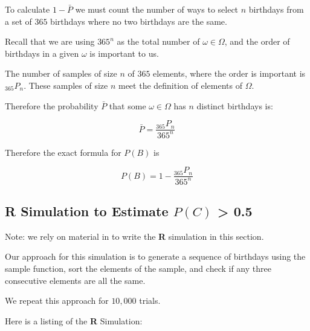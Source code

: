 \documentclass[a4paper,11pt]{article}
\begin{document}
To calculate $1-\bar{P}$ we must count the number of ways to select $n$
birthdays from a set of $365$ birthdays where no two birthdays are the
same.

Recall that we are using $365^{n}$ as the total number of
$\omega \in \Omega$, and the order of birthdays in a given $\omega${}
is important to us.

The number of samples of size $n$ of $365$ elements, where the order
is important is ${}_{365}P_{n}$. These samples of size $n$ meet the
definition of elements of $\Omega$.

Therefore the probability $\bar{P}$ that some $\omega \in \Omega$ has
$n$ distinct birthdays is:

\begin{equation}
  \bar{P} = \frac {{}_{365}P_{n}} {365^{n}}
\end{equation}

Therefore the exact formula for $P\left(B\right)$ is

\begin{equation}
  P\left(B\right) = 1 - \frac{{}_{365}P_{n}} {365^{n}}
\end{equation}

\subsection{\textbf{\textsf{R}} Simulation to Estimate 
  $P \left( C \right)$ > 0.5}

Note: we rely on material in \cite{rmanualStatsOr} to write the
\textbf{\textsf{R}} simulation in this section.

Our approach for this simulation is to generate a sequence of birthdays
using the sample function, sort the elements of the sample, and check
if any three consecutive elements are all the same.

We repeat this approach for $10,000$ trials.

Here is a listing of the \textbf{\textsf{R}} Simulation:
\end{document}
